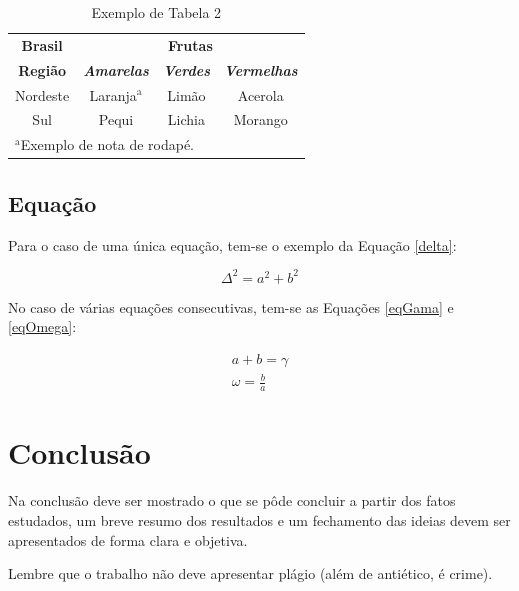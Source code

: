 \documentclass[conference]{ModeloA}
\begin{document}
\begin{table}[h]
	\caption{Exemplo de Tabela 2}
	\begin{center}
		\begin{tabular}{|c|c|c|c|}
			\hline
			\textbf{Brasil}&\multicolumn{3}{|c|}{\textbf{Frutas}} \\
			\cline{2-4} 
			\textbf{Região} & \textbf{\textit{Amarelas}}& \textbf{\textit{Verdes}}& \textbf{\textit{Vermelhas}} \\
			\hline
			Nordeste & Laranja$^{\mathrm{a}}$& Limão & Acerola  \\
			Sul & Pequi & Lichia & Morango \\ 
			\hline
			\multicolumn{4}{l}{$^{\mathrm{a}}$Exemplo de nota de rodapé.}
		\end{tabular}
		\label{tab2}
	\end{center}
\end{table}

\subsection{Equação}

Para o caso de uma única equação, tem-se o exemplo da Equação \ref{delta}:

\begin{equation}
	\Delta^2 = a^2 + b^2 \label{delta}
\end{equation}

No caso de várias equações consecutivas, tem-se as Equações \ref{eqGama} e \ref{eqOmega}:

\begin{eqnarray}
	a+b=\gamma \label{eqGama}\\
	\omega = \frac{b}{a} \label{eqOmega}
\end{eqnarray}



\section{Conclusão}

Na conclusão deve ser mostrado o que se pôde concluir a partir dos fatos estudados, um breve resumo dos resultados e um fechamento das ideias devem ser apresentados de forma clara e objetiva.

Lembre que o trabalho não deve apresentar plágio (além de antiético, é crime). 
\end{document}
